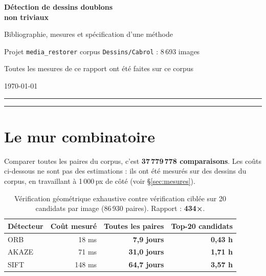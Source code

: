 \documentclass[11pt,a4paper]{article}
\newcommand{\alerte}[1]{\textcolor{alerte}{\textbf{#1}}}
\newcommand{\bon}[1]{\textcolor{vert}{\textbf{#1}}}
\begin{document}
\begin{center}
  {\LARGE\bfseries\color{accent} Détection de dessins doublons\\[2pt]
   non triviaux\par}
  \vspace{6pt}
  {\large Bibliographie, mesures et spécification d'une méthode\par}
  \vspace{4pt}
  {\small Projet \texttt{media\_restorer} \textbullet{} corpus
   \texttt{Dessins/Cabrol} : 8\,693 images\par}
  {\small Toutes les mesures de ce rapport ont été faites sur ce corpus\par}
  {\small \today\par}
\end{center}

\vspace{4pt}\hrule\vspace{10pt}
\tableofcontents
\vspace{10pt}\hrule

\section{Le mur combinatoire}
\label{sec:mur}

Comparer toutes les paires du corpus, c'est \textbf{37\,779\,778 comparaisons}.
Les coûts ci-dessous ne sont pas des estimations : ils ont été mesurés sur des
dessins du corpus, en travaillant à 1\,000\,px de côté (voir
§\ref{sec:mesures}).

\begin{table}[h]
\centering\small
\begin{tabular}{lrrr}
\toprule
\textbf{Détecteur} & \textbf{Coût mesuré} & \textbf{Toutes les paires}
  & \textbf{Top-20 candidats} \\
\midrule
ORB   & \phantom{0}18 ms & \alerte{7,9 jours}  & \bon{0,43 h} \\
AKAZE & \phantom{0}71 ms & \alerte{31,0 jours} & \bon{1,71 h} \\
SIFT  & 148 ms           & \alerte{64,7 jours} & \bon{3,57 h} \\
\bottomrule
\end{tabular}
\caption{Vérification géométrique exhaustive contre vérification ciblée sur
20 candidats par image (86\,930 paires). Rapport : \textbf{434×}.}
\end{table}
\end{document}
